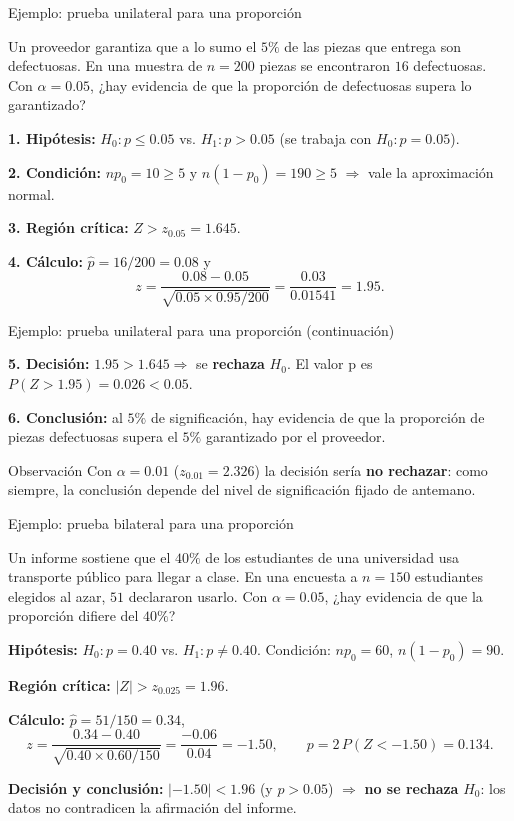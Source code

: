 \documentclass[aspectratio=169,11pt]{beamer}
\begin{document}
\begin{frame}{Ejemplo: prueba unilateral para una proporción}
\begin{example}
Un proveedor garantiza que a lo sumo el $5\%$ de las piezas que entrega son defectuosas. En una muestra de $n=200$ piezas se encontraron $16$ defectuosas. Con $\alpha=0.05$, ¿hay evidencia de que la proporción de defectuosas supera lo garantizado?

\textbf{1. Hipótesis:} $H_0:p\le0.05$ vs. $H_1:p>0.05$ (se trabaja con $H_0:p=0.05$).

\textbf{2. Condición:} $np_0=10\ge5$ y $n(1-p_0)=190\ge5$ $\Rightarrow$ vale la aproximación normal.

\textbf{3. Región crítica:} $Z>z_{0.05}=1.645$.

\textbf{4. Cálculo:} $\hat p=16/200=0.08$ y
\[
z=\frac{0.08-0.05}{\sqrt{0.05\times0.95/200}}=\frac{0.03}{0.01541}=1.95.
\]
\end{example}
\end{frame}

\begin{frame}{Ejemplo: prueba unilateral para una proporción (continuación)}
\begin{example}
\textbf{5. Decisión:} $1.95>1.645\Rightarrow$ se \textbf{rechaza} $H_0$. El valor p es $P(Z>1.95)=0.026<0.05$.

\textbf{6. Conclusión:} al $5\%$ de significación, hay evidencia de que la proporción de piezas defectuosas supera el $5\%$ garantizado por el proveedor.
\end{example}

\begin{alertblock}{Observación}
Con $\alpha=0.01$ ($z_{0.01}=2.326$) la decisión sería \textbf{no rechazar}: como siempre, la conclusión depende del nivel de significación fijado de antemano.
\end{alertblock}
\end{frame}

\begin{frame}{Ejemplo: prueba bilateral para una proporción}
\begin{example}
Un informe sostiene que el $40\%$ de los estudiantes de una universidad usa transporte público para llegar a clase. En una encuesta a $n=150$ estudiantes elegidos al azar, $51$ declararon usarlo. Con $\alpha=0.05$, ¿hay evidencia de que la proporción difiere del $40\%$?

\textbf{Hipótesis:} $H_0:p=0.40$ vs. $H_1:p\neq0.40$. Condición: $np_0=60$, $n(1-p_0)=90$.

\textbf{Región crítica:} $|Z|>z_{0.025}=1.96$.

\textbf{Cálculo:} $\hat p=51/150=0.34$,
\[
z=\frac{0.34-0.40}{\sqrt{0.40\times0.60/150}}=\frac{-0.06}{0.04}=-1.50, \qquad p=2\,P(Z<-1.50)=0.134.
\]

\textbf{Decisión y conclusión:} $|-1.50|<1.96$ (y $p>0.05$) $\Rightarrow$ \textbf{no se rechaza} $H_0$: los datos no contradicen la afirmación del informe.
\end{example}
\end{frame}
\end{document}
